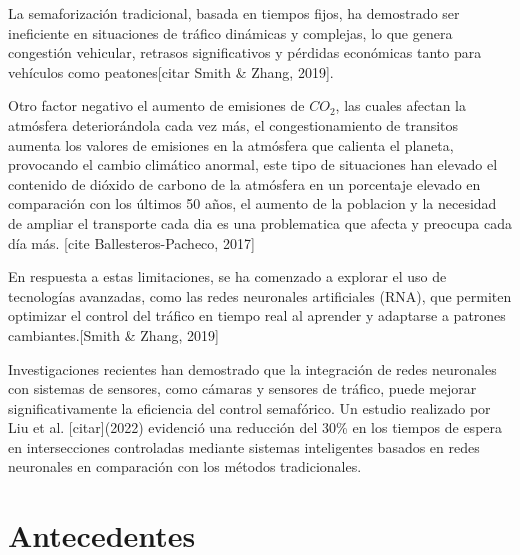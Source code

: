 \documentclass[conference]{IEEEtran}
\begin{document}
La semaforización tradicional, basada en tiempos fijos, ha demostrado ser ineficiente en situaciones de tráfico dinámicas y complejas, lo que genera congestión vehicular, retrasos significativos y pérdidas económicas tanto para vehículos como  peatones[citar Smith \& Zhang, 2019].

Otro factor negativo el aumento de emisiones de $CO_2$, las cuales afectan la atmósfera deteriorándola cada vez más, el congestionamiento de transitos aumenta los valores de emisiones en la atmósfera que calienta el planeta, provocando el cambio climático anormal, este tipo de situaciones han elevado el contenido de dióxido de carbono de la atmósfera en un porcentaje elevado en comparación con los últimos 50 años, el aumento de la poblacion y la necesidad de ampliar el transporte cada dia es una problematica que afecta y preocupa cada día más. [cite Ballesteros-Pacheco, 2017]

En respuesta a estas limitaciones, se ha comenzado a explorar el uso de tecnologías avanzadas, como las redes neuronales artificiales (RNA), que permiten optimizar el control del tráfico en tiempo real al aprender y adaptarse a patrones cambiantes.[Smith \& Zhang, 2019]

Investigaciones recientes han demostrado que la integración de redes neuronales con sistemas de sensores, como cámaras y sensores de tráfico, puede mejorar significativamente la eficiencia del control semafórico. Un estudio realizado por Liu et al. [citar](2022) evidenció una reducción del 30\% en los tiempos de espera en intersecciones controladas mediante sistemas inteligentes basados en redes neuronales en comparación con los métodos tradicionales.

\section{Antecedentes}
\end{document}
